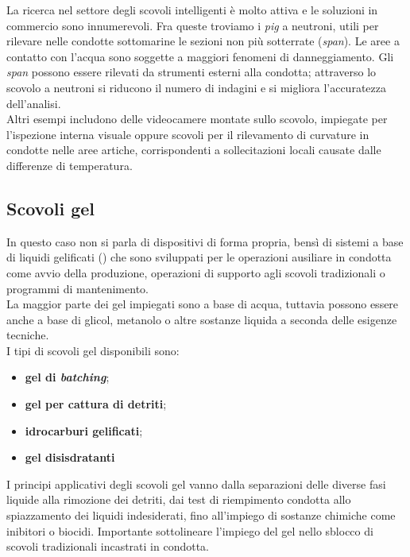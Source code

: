 La ricerca nel settore degli scovoli intelligenti è molto attiva e le soluzioni in commercio sono innumerevoli. Fra queste troviamo i \textit{pig} a neutroni, utili per rilevare nelle condotte sottomarine le sezioni non più sotterrate (\textit{span}). Le aree a contatto con l'acqua sono soggette a maggiori fenomeni di danneggiamento. 
Gli \textit{span} possono essere rilevati da strumenti esterni alla condotta; attraverso lo scovolo a neutroni si riducono il numero di indagini e si migliora l'accuratezza dell'analisi.\\
Altri esempi includono delle videocamere montate sullo scovolo, impiegate per l'ispezione interna visuale oppure scovoli per il rilevamento di curvature in condotte nelle aree artiche, corrispondenti a sollecitazioni locali causate dalle differenze di temperatura.

\subsection{Scovoli gel}
In questo caso non si parla di dispositivi di forma propria, bensì di sistemi a base di liquidi gelificati () che sono sviluppati per le operazioni ausiliare in condotta come avvio della produzione, operazioni di supporto agli scovoli tradizionali o programmi di mantenimento.\\
La maggior parte dei gel impiegati sono a base di acqua, tuttavia possono essere anche a base di glicol, metanolo o altre sostanze liquida a seconda delle esigenze tecniche.\\
I tipi di scovoli gel disponibili sono:
\begin{itemize}
	\item \textbf{gel di \textit{batching}};
	\item \textbf{gel per cattura di detriti};
	\item \textbf{idrocarburi gelificati};
	\item \textbf{gel disisdratanti}
\end{itemize}

I principi applicativi degli scovoli gel vanno dalla separazioni delle diverse fasi liquide alla rimozione dei detriti, dai test di riempimento condotta allo spiazzamento dei liquidi indesiderati, fino all'impiego di sostanze chimiche come inibitori o biocidi. Importante sottolineare l'impiego del gel nello sblocco di scovoli tradizionali incastrati in condotta.

